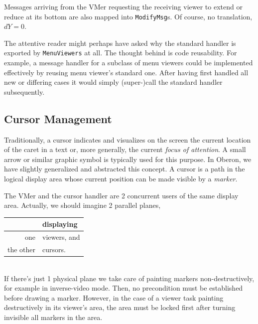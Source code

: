 Messages arriving from the VMer requesting the receiving viewer to extend or reduce
at its bottom are also mapped into \verb|ModifyMsg|s. Of course, no translation, $dY = 0$.

The attentive reader might perhaps have asked why the standard handler
is exported by \verb|MenuViewers| at all.  The thought behind is code reusability.
For example, a message handler for a subclass of menu viewers could be implemented effectively
by reusing menu viewer's standard one.  After having first handled all new or differing cases
it would simply (super-)call the standard handler subsequently.

\subsection{Cursor Management}
Traditionally, a cursor indicates and visualizes on the screen the current location of the caret
in a text or, more generally, the current \emph{focus of attention}.
A small arrow or similar graphic symbol is typically used for this purpose.
In Oberon, we have slightly generalized and abstracted this concept.
A cursor is a path in the logical display area whose current position can be made visible by a \emph{marker}.

The VMer and the cursor handler are 2 concurrent users of the same display area.
Actually, we should imagine 2 parallel planes,
\begin{table}[h!]
  \centering
  \begin{tabular}{r l}
              & displaying \\\hline
          one & viewers, and \\
    the other & cursors.
  \end{tabular}
\end{table}
\\If there's just 1 physical plane we take care of painting markers non-destructively, for example
in inverse-video mode.  Then, no precondition must be established before drawing a marker.
However, in the case of a viewer task painting destructively in its viewer's area,
the area must be locked first after turning invisible all markers in the area.

